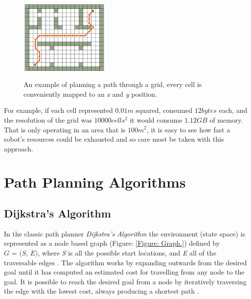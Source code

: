\begin{figure}[htbp]

\center \includegraphics[width=125pt]{illustrations/grid}\\
\caption{An example of planning a path through a grid, every cell is conveniently mapped to an \textit{x} and \textit{y} position. \cite{MOTION}} 
\label{Figure: Grid.}

\end{figure}

\noindent
For example, if each cell represented $0.01m$ squared, consumed $12 bytes$ each, and the resolution of the grid was $10000cells^{2}$ it would consume $1.12GB$ of memory. That is only operating in an area that is $100m^{2}$, it is easy to see how fast a robot's resources could be exhausted and so care most be taken with this approach.


\section{Path Planning Algorithms}

\subsection{Dijkstra's Algorithm}
\noindent
In the classic path planner \textit{Dijkstra's Algorithm} \cite{DIJKSTRA} the environment (state space) is represented as a node based graph (Figure: \ref{Figure: Graph.}) defined by $\textit{G = (S, E)}$, where \textit{S} is all the possible start locations, and \textit{E} all of the traversable edges \cite{HEURISTIC}. The algorithm works by expanding outwards from the desired goal until it has computed an estimated cost for travelling from any node to the goal. It is possible to reach the desired goal from a node by iteratively traversing the edge with the lowest cost, always producing a shortest path \cite{ARNIE13}.

